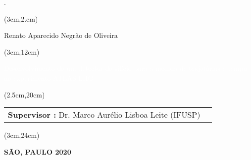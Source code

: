 \begin{titlepage}.
    

    \vspace{3.5cm}

    
    \begin{textblock*}{15cm}(3cm,2.cm)
        \makeatletter
        \begin{huge}
            \begin{center}
                \color{black}
                 Renato Aparecido Negrão de Oliveira\\ 
            \end{center}
         \end{huge}
     
    \end{textblock*}
    
    \begin{textblock*}{15cm}(3cm,12cm)
        \begin{Huge}
            \begin{center}
                \makeatletter
                \noindent\textcolor{white}{Desenvolvimento de um detector de silício para a medida de trajetórias e tempo no experimento ATLAS-LHC}
                \makeatother
            \end{center}
        \end{Huge}
    \end{textblock*}

    \begin{textblock*}{15cm}(2.5cm,20cm)
        \makeatletter
        \begin{LARGE}
            \setcellgapes{4pt}
            \makegapedcells
            {\color{black}\begin{tabularx}{15cm}{XX}
                \textbf{Supervisor :} Dr. Marco Aurélio Lisboa Leite (IFUSP)\\ 
            \end{tabularx}}
        \end{LARGE}
        \makeatother
    \end{textblock*}
    
    \begin{textblock*}{15cm}(3cm,24cm)
        \makeatletter
        \begin{center}
            {\color{black}
                \textbf{SÃO, PAULO 2020} 
            }
        \end{center}
        \makeatother
    \end{textblock*}

\end{titlepage}

